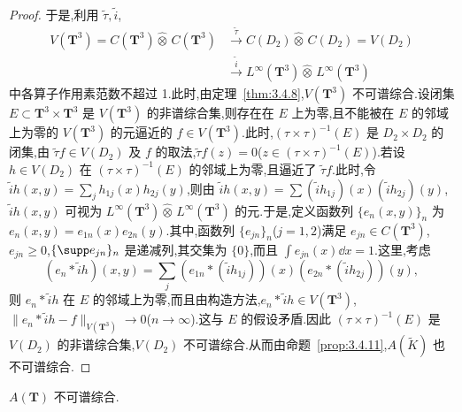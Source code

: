 \begin{proof}
于是,利用 $\widetilde{\tau}, \widetilde{i}$,
\begin{align*}
V(\mathbf{T}^{3}) = C(\mathbf{T}^{3}) \widehat{\otimes}\, C(\mathbf{T}^{3}) &\xrightarrow{\widetilde{\tau}} C(D_{2}) \widehat{\otimes}\, C(D_{2}) = V(D_{2})\\
&\xrightarrow{\widetilde{i}} L^{\infty}(\mathbf{T}^{3}) \widehat{\otimes}\, L^{\infty}(\mathbf{T}^{3})
\end{align*}
中各算子作用素范数不超过 1.此时,由定理~\ref{thm:3.4.8},$V(\mathbf{T}^{3})$ 不可谱综合.设闭集 $E \subset \mathbf{T}^{3} \times \mathbf{T}^{3}$ 是 $V(\mathbf{T}^{3})$ 的非谱综合集,则存在在 $E$ 上为零,且不能被在 $E$ 的邻域上为零的 $V(\mathbf{T}^{3})$ 的元逼近的 $f \in V(\mathbf{T}^{3})$.此时,$(\tau \times \tau)^{-1}(E)$ 是 $D_{2} \times D_{2}$ 的闭集,由 $\widetilde{\tau}f \in V(D_{2})$ 及 $f$ 的取法,$\widetilde{\tau}f(z) = 0$($z \in (\tau \times \tau)^{-1}(E)$).若设 $h \in V(D_{2})$ 在 $(\tau \times \tau)^{-1}(E)$ 的邻域上为零,且逼近了 $\widetilde{\tau}f$.此时,令 $\tilde{i}h(x, y) = \sum_{j}h_{1j}(x)h_{2j}(y)$,则由 $\tilde{i}h(x, y) = \sum(\tilde{i}h_{1j})(x)(\tilde{i}h_{2j})(y)$,$\tilde{i}h(x, y)$ 可视为 $L^{\infty}(\mathbf{T}^{3}) \widehat{\otimes}\, L^{\infty}(\mathbf{T}^{3})$ 的元.于是,定义函数列 $\{e_{n}(x, y)\}_{n}$ 为 $e_{n}(x, y) = e_{1n}(x)e_{2n}(y)$.其中,函数列 $\{e_{jn}\}_{n}$($j = 1, 2$)满足 $e_{jn} \in C(\mathbf{T}^{3})$,$e_{jn} \geq 0$,$\{\supp e_{jn}\}_{n}$ 是递减列,其交集为 $\{0\}$,而且 $\int e_{jn}(x)\dd x = 1$.这里,考虑
\begin{equation*}
(e_{n} * \widetilde{i}h)(x, y) = \sum_{j}(e_{1n} * (\widetilde{i}h_{1j}))(x)(e_{2n} * (\widetilde{i}h_{2j}))(y),
\end{equation*}
则 $e_{n} * \widetilde{i}h$ 在 $E$ 的邻域上为零,而且由构造方法,$e_{n} * \widetilde{i}h \in V(\mathbf{T}^{3})$,$\|e_{n} * \widetilde{i}h - f\|_{V(\mathbf{T}^{3})} \to 0$($n \to \infty$).这与 $E$ 的假设矛盾.因此 $(\tau \times \tau)^{-1}(E)$ 是 $V(D_{2})$ 的非谱综合集,$V(D_{2})$ 不可谱综合.从而由命题~\ref{prop:3.4.11},$A(\widetilde{K})$ 也不可谱综合.
\end{proof}

\begin{theorem}\label{thm:3.4.13}
$A(\mathbf{T})$ 不可谱综合.
\end{theorem}

